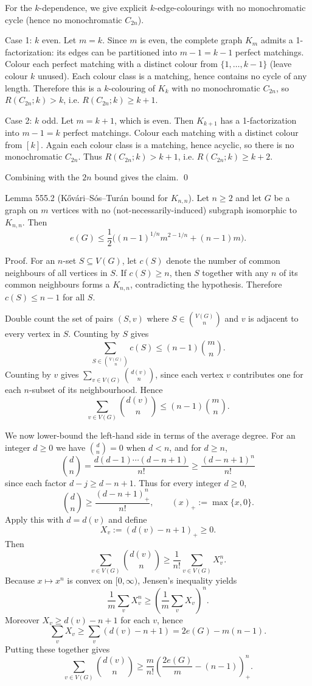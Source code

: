 For the $k$-dependence, we give explicit $k$-edge-colourings with no monochromatic cycle (hence no monochromatic $C_{2n}$).

Case 1: $k$ even.
Let $m=k$. Since $m$ is even, the complete graph $K_m$ admits a 1-factorization: its edges can be partitioned into $m-1=k-1$ perfect matchings.
Colour each perfect matching with a distinct colour from $\{1,\dots,k-1\}$ (leave colour $k$ unused).
Each colour class is a matching, hence contains no cycle of any length.
Therefore this is a $k$-colouring of $K_k$ with no monochromatic $C_{2n}$, so $R(C_{2n};k)>k$, i.e. $R(C_{2n};k)\ge k+1$.

Case 2: $k$ odd.
Let $m=k+1$, which is even.
Then $K_{k+1}$ has a 1-factorization into $m-1=k$ perfect matchings.
Colour each matching with a distinct colour from $[k]$.
Again each colour class is a matching, hence acyclic, so there is no monochromatic $C_{2n}$.
Thus $R(C_{2n};k)>k+1$, i.e. $R(C_{2n};k)\ge k+2$.

Combining with the $2n$ bound gives the claim.
\qed

Lemma 555.2 (K\H{o}v\'ari--S\'os--Tur\'an bound for $K_{n,n}$).
Let $n\ge 2$ and let $G$ be a graph on $m$ vertices with no (not-necessarily-induced) subgraph isomorphic to $K_{n,n}$.
Then
\[
e(G)\le \frac12\Big((n-1)^{1/n} m^{2-1/n}+(n-1)m\Big).
\]

Proof.
For an $n$-set $S\subseteq V(G)$, let $c(S)$ denote the number of common neighbours of all vertices in $S$.
If $c(S)\ge n$, then $S$ together with any $n$ of its common neighbours forms a $K_{n,n}$, contradicting the hypothesis.
Therefore $c(S)\le n-1$ for all $S$.

Double count the set of pairs $(S,v)$ where $S\in\binom{V(G)}{n}$ and $v$ is adjacent to every vertex in $S$.
Counting by $S$ gives
\[
\sum_{S\in\binom{V(G)}{n}} c(S)\le (n-1)\binom{m}{n}.
\tag{1}
\]
Counting by $v$ gives $\sum_{v\in V(G)}\binom{d(v)}{n}$, since each vertex $v$ contributes one for each $n$-subset of its neighbourhood.
Hence
\[
\sum_{v\in V(G)}\binom{d(v)}{n}\le (n-1)\binom{m}{n}.
\tag{1'}
\]

We now lower-bound the left-hand side in terms of the average degree.
For an integer $d\ge 0$ we have $\binom{d}{n}=0$ when $d<n$, and for $d\ge n$,
\[
\binom{d}{n}=\frac{d(d-1)\cdots(d-n+1)}{n!}\ge \frac{(d-n+1)^n}{n!}
\]
since each factor $d-j\ge d-n+1$.
Thus for every integer $d\ge 0$,
\[
\binom{d}{n}\ge \frac{(d-n+1)_+^n}{n!},\qquad (x)_+:=\max\{x,0\}.
\]
Apply this with $d=d(v)$ and define
\[
X_v:=(d(v)-n+1)_+\ge 0.
\]
Then
\[
\sum_{v\in V(G)}\binom{d(v)}{n}\ge \frac{1}{n!}\sum_{v\in V(G)} X_v^n.
\]
Because $x\mapsto x^n$ is convex on $[0,\infty)$, Jensen's inequality yields
\[
\frac{1}{m}\sum_v X_v^n\ge \left(\frac{1}{m}\sum_v X_v\right)^n.
\]
Moreover $X_v\ge d(v)-n+1$ for each $v$, hence
\[
\sum_v X_v\ge \sum_v (d(v)-n+1)=2e(G)-m(n-1).
\]
Putting these together gives
\[
\sum_{v\in V(G)}\binom{d(v)}{n}
\ge \frac{m}{n!}\left(\frac{2e(G)}{m}-(n-1)\right)_+^n.
\tag{2}
\]


